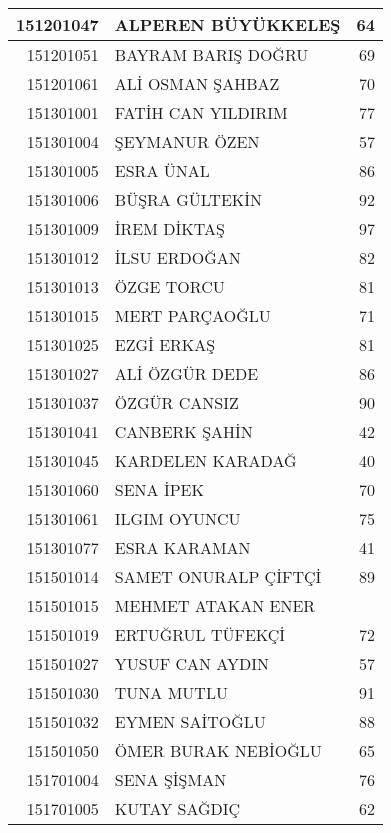 \documentclass[12pt]{article}
\begin{document}
\begin{longtable}{||r||l||r||}
    \midrule
    151201047 & ALPEREN BÜYÜKKELEŞ & 64 \\
    \midrule
    151201051 & BAYRAM BARIŞ DOĞRU & \cellcolor[rgb]{ 1,  1,  0} 69 \\
    \midrule
    151201061 & ALİ OSMAN ŞAHBAZ & 70 \\
    \midrule
    151301001 & FATİH CAN YILDIRIM & 77 \\
    \midrule
    151301004 & ŞEYMANUR ÖZEN & 57 \\
    \midrule
    151301005 & ESRA ÜNAL & 86 \\
    \midrule
    151301006 & BÜŞRA GÜLTEKİN & 92 \\
    \midrule
    151301009 & İREM DİKTAŞ & 97 \\
    \midrule
    151301012 & İLSU ERDOĞAN & 82 \\
    \midrule
    151301013 & ÖZGE TORCU & 81 \\
    \midrule
    151301015 & MERT PARÇAOĞLU & 71 \\
    \midrule
    151301025 & EZGİ ERKAŞ & 81 \\
    \midrule
    151301027 & ALİ ÖZGÜR DEDE & 86 \\
    \midrule
    151301037 & ÖZGÜR CANSIZ & 90 \\
    \midrule
    151301041 & CANBERK ŞAHİN & 42 \\
    \midrule
    151301045 & KARDELEN KARADAĞ & 40 \\
    \midrule
    151301060 & SENA İPEK & 70 \\
    \midrule
    151301061 & ILGIM OYUNCU & 75 \\
    \midrule
    151301077 & ESRA KARAMAN & 41 \\
    \midrule
    151501014 & SAMET ONURALP ÇİFTÇİ & 89 \\
    \midrule
    151501015 & MEHMET ATAKAN ENER &  \\
    \midrule
    151501019 & ERTUĞRUL TÜFEKÇİ & 72 \\
    \midrule
    151501027 & YUSUF CAN AYDIN & 57 \\
    \midrule
    151501030 & TUNA MUTLU & 91 \\
    \midrule
    151501032 & EYMEN SAİTOĞLU & 88 \\
    \midrule
    151501050 & ÖMER BURAK NEBİOĞLU & 65 \\
    \midrule
    151701004 & SENA ŞİŞMAN & 76 \\
    \midrule
    151701005 & KUTAY SAĞDIÇ & \cellcolor[rgb]{ 1,  1,  0} 62 \\

\end{longtable}
\end{document}
